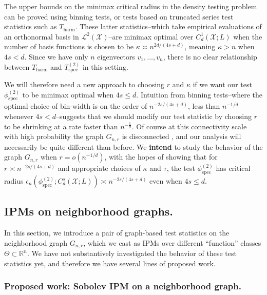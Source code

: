 \documentclass{article}
\newcommand{\Reals}{\mathbb{R}}
\newcommand{\1}{\mathbf{1}}
\theoremstyle{alden}
\theoremstyle{aldenthm}
\theoremstyle{definition}
\theoremstyle{remark}
\begin{document}
The upper bounds on the minimax critical radius in the density testing problem can be proved using binning tests, or tests based on truncated series test statistics such as $T_{\mathrm{harm}}$. These latter statistics--which take empirical evaluations of an orthonormal basis in $\mathcal{L}^2(\mathcal{X})$--are minimax optimal over $C_d^{1}(\mathcal{X};L)$ when the number of basis functions is chosen to be $\kappa \asymp n^{2d/(4s+d)}$, meaning $\kappa > n$ when $4s < d$. Since we have only $n$ eigenvectors $v_1,\ldots,v_n$, there is no clear relationship between $T_{\mathrm{harm}}$ and $T_{\mathrm{spec}}^{(2)}$ in this setting.

We will therefore need a new approach to choosing $r$ and $\kappa$ if we want our test $\phi_{\mathrm{spec}}^{(2)}$ to be minimax optimal when $4s \leq d$. Intuition from binning tests--where the optimal choice of bin-width is on the order of $n^{-2s/(4s+d)}$, less than $n^{-1/d}$ whenever $4s < d$--suggests that we should modify our test statistic by choosing $r$ to be shrinking at a rate faster than $n^{-\frac{1}{d}}$. Of course at this connectivity scale with high probability the graph $G_{n,r}$ is disconnected \cite{penrose99}, and our analysis will necessarily be quite different than before. We \textbf{intend} to study the behavior of the graph $G_{n,r}$ when $r = o(n^{-1/d})$, with the hopes of showing that for $r \asymp n^{-2s/(4s+d)}$ and appropriate choices of $\kappa$ and $\tau$, the test $\phi_{\mathrm{spec}}^{(2)}$ has critical radius $\epsilon_n(\phi_{\mathrm{spec}}^{(2)}; C_d^{s}(\mathcal{X};L)) \asymp n^{-2s/(4s + d)}$ even when $4s \leq d$.

\subsection{IPMs on neighborhood graphs.}
\label{sec:neighborhood_graph_IPMs}

In this section, we introduce a pair of graph-based test statistics on the neighborhood graph $G_{n,r}$, which we cast as IPMs over different ``function'' classes $\Theta \subset \Reals^n$. We have not substantively investigated the behavior of these test statistics yet, and therefore we have several lines of proposed work.

\subsubsection{Proposed work: Sobolev IPM on a neighborhood graph.}
\end{document}
